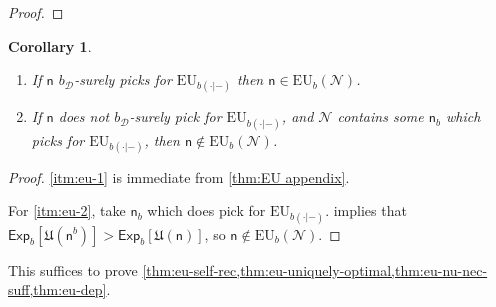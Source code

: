 \documentclass[a4paper]{article}
\newtheorem{corollary}[theorem]{Corollary}
\newcommand\Exp{\mathsf{Exp}}
\newcommand\EU{\mathrm{EU}}
\newcommand\U{\mathfrak{U}} %
\newcommand{\D}{\mathcal{D}}
\newcommand{\Decs}{\mathcal{D}}
\newcommand{\n}{\mathsf{n}}
\renewcommand{\nu}{\n}
\newcommand\Nu{\mathcal{N}}
\renewcommand{\color}[1]{}
\newenvironment{colored}[1]{\leavevmode\color{#1}}{}
\renewcommand{\leq}{\leqslant}
\newenvironment{CCM rewritten}
{\begingroup\color{blue}} %
{\endgroup}              %
\begin{document}
\begin{colored}{violet}
\begin{proof}
%
%
%
\end{proof}
\begin{corollary}
	\begin{enumerate}
		\item\label{itm:eu-1} If $\nu$ $b_\Decs$-surely picks for $\EU_{b(\cdot|-)}$ then $\nu\in\EU_b(\Nu)$.
		\item \label{itm:eu-2} If $\nu$ does not $b_\Decs$-surely pick for $\EU_{b(\cdot|-)}$, and $\Nu$ contains some $\nu_b$ which picks for $\EU_{b(\cdot|-)}$, then $\nu\notin\EU_b(\Nu)$.
	\end{enumerate}
\end{corollary}
\begin{proof}
	\cref{itm:eu-1} is immediate from \cref{thm:EU appendix}. 
	
	For \cref{itm:eu-2}, take $\nu_b$ which does pick for $\EU_{b(\cdot|-)}$.  implies that $\Exp_b[\U(\nu^b)]>\Exp_b[\U(\nu)]$, so $\nu\notin\EU_b(\Nu)$. 
\end{proof}

This suffices to prove \cref{thm:eu-self-rec,thm:eu-uniquely-optimal,thm:eu-nu-nec-suff,thm:eu-dep}.

\end{colored}
\end{document}
